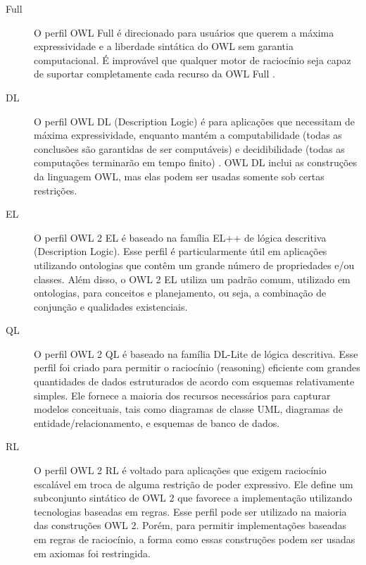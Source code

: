 %
\begin{description}
\item [{Full}] \foreignlanguage{brazil}{O perfil }OWL Full\foreignlanguage{brazil}{
é direcionado para usuários que querem a máxima expressividade e a
liberdade sintática do }OWL\foreignlanguage{brazil}{ sem garantia
computacional. É improvável que qualquer motor de raciocínio seja
capaz de suportar completamente cada recurso da }OWL Full\foreignlanguage{brazil}{
\citep{mcguinness2004owl}.}
%
\item [{DL}] O perfil \foreignlanguage{english}{OWL DL} (\foreignlanguage{english}{Description
Logic}) é para aplicações que necessitam de máxima expressividade,
enquanto mantém a computabilidade (todas as conclusões são garantidas
de ser computáveis) e decidibilidade (todas as computações terminarão
em tempo finito) \citep{mcguinness2004owl}. \foreignlanguage{english}{OWL
DL} inclui as construções da linguagem \foreignlanguage{english}{OWL},
mas elas podem ser usadas somente sob certas restrições. 
\item [{EL}] O perfil \foreignlanguage{english}{OWL} 2 EL é baseado na
família EL++ de lógica descritiva (\foreignlanguage{english}{Description}
\foreignlanguage{english}{Logic}). Esse perfil é particularmente útil
em aplicações utilizando ontologias que contêm um grande número de
propriedades e/ou classes. Além disso, o \foreignlanguage{english}{OWL}
2 EL utiliza um padrão comum, utilizado em ontologias, para conceitos
e planejamento, ou seja, a combinação de conjunção e qualidades existenciais.
%
\item [{QL}] \foreignlanguage{brazil}{O perfil }OWL 2 QL\foreignlanguage{brazil}{
é baseado na família }DL-Lite\foreignlanguage{brazil}{ de lógica descritiva.
Esse perfil foi criado para permitir o raciocínio (}reasoning\foreignlanguage{brazil}{)
eficiente com grandes quantidades de dados estruturados de acordo
com esquemas relativamente simples. Ele fornece a maioria dos recursos
necessários para capturar modelos conceituais, tais como diagramas
de classe UML, diagramas de entidade/relacionamento, e esquemas de
banco de dados. }
%
\item [{RL}] O perfil \foreignlanguage{english}{OWL 2 RL} é voltado para
aplicações que exigem raciocínio escalável em troca de alguma restrição
de poder expressivo. Ele define um subconjunto sintático de \foreignlanguage{english}{OWL
2} que favorece a implementação utilizando tecnologias baseadas em
regras. Esse perfil pode ser utilizado na maioria das construções
\foreignlanguage{english}{OWL 2}. Porém, para permitir implementações
baseadas em regras de raciocínio, a forma como essas construções podem
ser usadas em axiomas foi restringida. 
\end{description}
%

